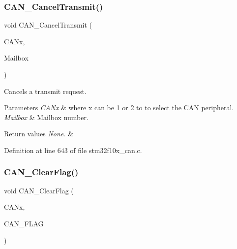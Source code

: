 \subsubsection{\texorpdfstring{C\+A\+N\+\_\+\+Cancel\+Transmit()}{CAN\_CancelTransmit()}}
{\footnotesize\ttfamily void C\+A\+N\+\_\+\+Cancel\+Transmit (\begin{DoxyParamCaption}\item[{\hyperlink{struct_c_a_n___type_def}{C\+A\+N\+\_\+\+Type\+Def} $\ast$}]{C\+A\+Nx,  }\item[{uint8\+\_\+t}]{Mailbox }\end{DoxyParamCaption})}



Cancels a transmit request. 


\begin{DoxyParams}{Parameters}
{\em C\+A\+Nx} & where x can be 1 or 2 to to select the C\+AN peripheral. \\
\hline
{\em Mailbox} & Mailbox number. \\
\hline
\end{DoxyParams}

\begin{DoxyRetVals}{Return values}
{\em None.} & \\
\hline
\end{DoxyRetVals}


Definition at line 643 of file stm32f10x\+\_\+can.\+c.

\mbox{\label{group___c_a_n___private___functions_ga2c01646d5d3a2d7045e8dd71f58f8742}} 
\subsubsection{\texorpdfstring{C\+A\+N\+\_\+\+Clear\+Flag()}{CAN\_ClearFlag()}}
{\footnotesize\ttfamily void C\+A\+N\+\_\+\+Clear\+Flag (\begin{DoxyParamCaption}\item[{\hyperlink{struct_c_a_n___type_def}{C\+A\+N\+\_\+\+Type\+Def} $\ast$}]{C\+A\+Nx,  }\item[{uint32\+\_\+t}]{C\+A\+N\+\_\+\+F\+L\+AG }\end{DoxyParamCaption})}



